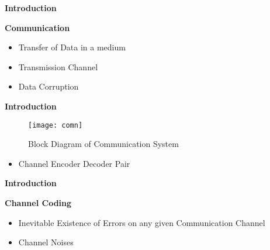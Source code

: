 \documentclass{beamer}
\begin{document}
\begin{frame}{\scriptsize \LARGE \centering \textbf{Introduction}}
\begin{block}{\textbf{Communication}}
		\begin{itemize}
		\pause 
		\item Transfer of Data in a medium
		\pause
		\item Transmission Channel 
		\pause
		\item Data Corruption
				
				\end{itemize}	
	\end{block}	
\end{frame}


\begin{frame}{\scriptsize \LARGE \centering \textbf{Introduction}}	
	
	\begin{center}
	\begin{figure}
	
	\texttt{[image: comn]}
	\caption{Block Diagram of Communication System}
	\end{figure}
	\end{center}
		\begin{itemize}	
		\pause
			\item Channel Encoder Decoder Pair
			
		\end{itemize}	
	
\end{frame}


\begin{frame}{\scriptsize \LARGE \centering \textbf{Introduction}}
			\begin{block}{\textbf{Channel Coding}}
				\begin{itemize}
					\pause 
					\item Inevitable Existence of Errors on any given Communication Channel
				\pause
					\item Channel Noises
				\end{itemize}
			\end{block}		
\end{frame}
\end{document}
